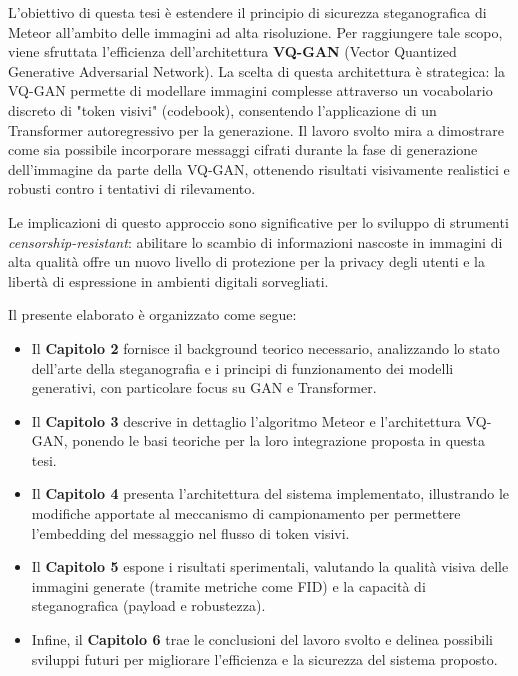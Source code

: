 L'obiettivo di questa tesi è estendere il principio di sicurezza steganografica di Meteor all'ambito delle immagini ad alta risoluzione.
Per raggiungere tale scopo, viene sfruttata l'efficienza dell'architettura \textbf{VQ-GAN} (Vector Quantized Generative Adversarial Network). La scelta di questa architettura è strategica: la VQ-GAN permette di modellare immagini complesse attraverso un vocabolario discreto di "token visivi" (codebook), consentendo l'applicazione di un Transformer autoregressivo per la generazione.
Il lavoro svolto mira a dimostrare come sia possibile incorporare messaggi cifrati durante la fase di generazione dell'immagine da parte della VQ-GAN, ottenendo risultati visivamente realistici e robusti contro i tentativi di rilevamento.

Le implicazioni di questo approccio sono significative per lo sviluppo di strumenti \emph{censorship-resistant}: abilitare lo scambio di informazioni nascoste in immagini di alta qualità offre un nuovo livello di protezione per la privacy degli utenti e la libertà di espressione in ambienti digitali sorvegliati.

\medskip


Il presente elaborato è organizzato come segue:

\begin{itemize}
	\item Il \textbf{Capitolo 2} fornisce il background teorico necessario, analizzando lo stato dell'arte della steganografia e i principi di funzionamento dei modelli generativi, con particolare focus su GAN e Transformer.
	
	\item Il \textbf{Capitolo 3} descrive in dettaglio l'algoritmo Meteor e l'architettura VQ-GAN, ponendo le basi teoriche per la loro integrazione proposta in questa tesi.
	
	\item Il \textbf{Capitolo 4} presenta l'architettura del sistema implementato, illustrando le modifiche apportate al meccanismo di campionamento per permettere l'embedding del messaggio nel flusso di token visivi.
	
	\item Il \textbf{Capitolo 5} espone i risultati sperimentali, valutando la qualità visiva delle immagini generate (tramite metriche come FID) e la capacità di steganografica (payload e robustezza).
	
	\item Infine, il \textbf{Capitolo 6} trae le conclusioni del lavoro svolto e delinea possibili sviluppi futuri per migliorare l'efficienza e la sicurezza del sistema proposto.
\end{itemize}